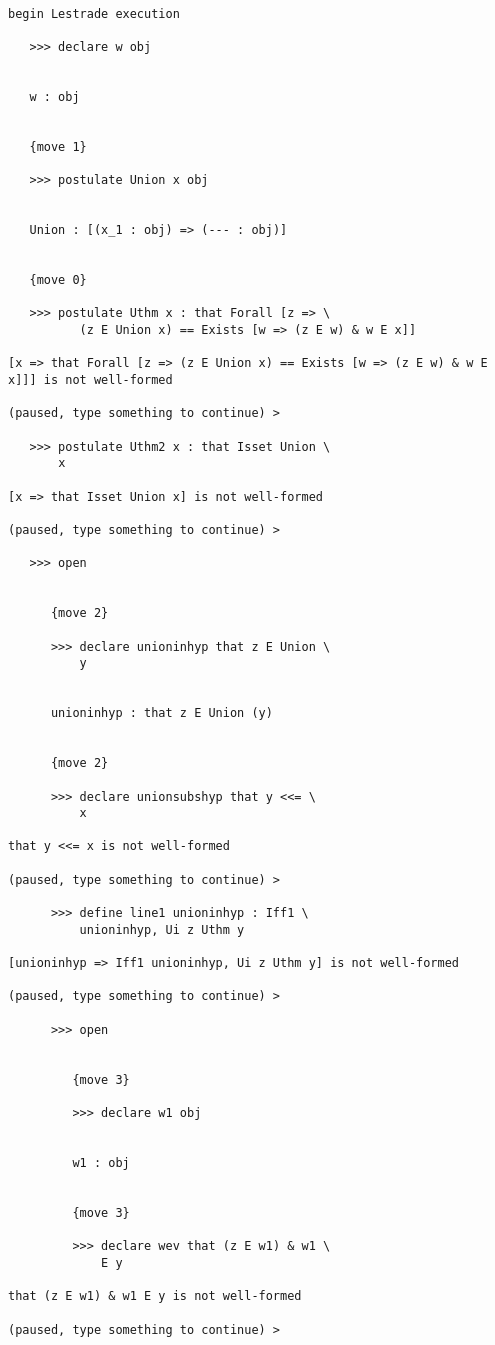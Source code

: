 \documentclass[12pt]{article}
\begin{document}
\begin{verbatim}

begin Lestrade execution

   >>> declare w obj


   w : obj


   {move 1}

   >>> postulate Union x obj


   Union : [(x_1 : obj) => (--- : obj)]


   {move 0}

   >>> postulate Uthm x : that Forall [z => \
          (z E Union x) == Exists [w => (z E w) & w E x]]

[x => that Forall [z => (z E Union x) == Exists [w => (z E w) & w E x]]] is not well-formed

(paused, type something to continue) >

   >>> postulate Uthm2 x : that Isset Union \
       x

[x => that Isset Union x] is not well-formed

(paused, type something to continue) >

   >>> open


      {move 2}

      >>> declare unioninhyp that z E Union \
          y


      unioninhyp : that z E Union (y)


      {move 2}

      >>> declare unionsubshyp that y <<= \
          x

that y <<= x is not well-formed

(paused, type something to continue) >

      >>> define line1 unioninhyp : Iff1 \
          unioninhyp, Ui z Uthm y

[unioninhyp => Iff1 unioninhyp, Ui z Uthm y] is not well-formed

(paused, type something to continue) >

      >>> open


         {move 3}

         >>> declare w1 obj


         w1 : obj


         {move 3}

         >>> declare wev that (z E w1) & w1 \
             E y

that (z E w1) & w1 E y is not well-formed

(paused, type something to continue) >


\end{verbatim}
\end{document}
